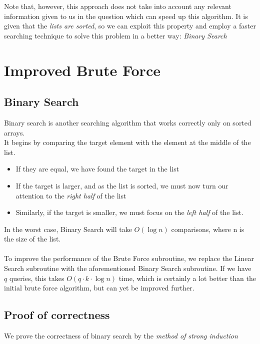 \documentclass[11pt]{article}
\begin{document}
Note that, however, this approach does not take into account any relevant information given to us in the question which can speed up this algorithm. It is given that the \textit{lists are sorted}, so we can exploit this property and employ a faster searching technique to solve this problem in a better way: \textit{Binary Search}




\section{Improved Brute Force}
\subsection{Binary Search}



Binary search is another searching algorithm that works correctly only on sorted arrays. \\
It begins by comparing the target element with the element at the middle of the list. 
\begin{itemize}
    \item If they are equal, we have found the target in the list
    \item If the target is larger, and as the list is sorted, we must now turn our attention to the \textit{right half} of the list
    \item Similarly, if the target is smaller, we must focus on the \textit{left half} of the list.
\end{itemize}

In the worst case, Binary Search will take $O(\log n)$ comparisons, where n is the size of the list. \\ \\


To improve the performance of the Brute Force subroutine, we replace the Linear Search subroutine with the aforementioned Binary Search subroutine. If we have $q$ queries, this takes $O(q \cdot k \cdot \log n)$ time, which is certainly a lot better than the initial brute force algorithm, but can yet be improved further.


\subsection{Proof of correctness}
We prove the correctness of binary search by the \textit{method of strong induction} 
\end{document}
